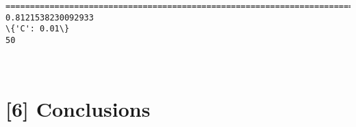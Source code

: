 \documentclass[11pt]{article}
\begin{document}
    \begin{Verbatim}[commandchars=\\\{\}]
====================================================================================================
0.8121538230092933
\{'C': 0.01\}
50

    \end{Verbatim}

    \begin{center}
    \end{center}
    { \hspace*{\fill} \\}
    
    \section{{[}6{]} Conclusions}\label{conclusions}
\end{document}
